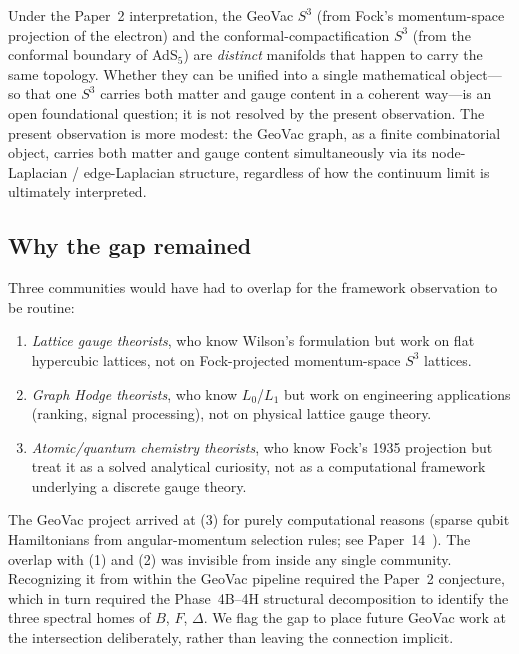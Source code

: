 \documentclass[aps,pra,twocolumn,superscriptaddress,longbibliography]{revtex4-2}
\begin{document}
Under the Paper~2 interpretation, the GeoVac $S^3$ (from Fock's
momentum-space projection of the electron) and the
conformal-compactification $S^3$ (from the conformal boundary of
AdS$_5$) are \emph{distinct} manifolds that happen to carry the same
topology.  Whether they can be unified into a single mathematical
object---so that one $S^3$ carries both matter and gauge content in
a coherent way---is an open foundational question; it is not
resolved by the present observation.  The present observation is
more modest: the GeoVac graph, as a finite combinatorial object,
carries both matter and gauge content simultaneously via its
node-Laplacian / edge-Laplacian structure, regardless of how the
continuum limit is ultimately interpreted.

\subsection{Why the gap remained}

Three communities would have had to overlap for the
framework observation to be routine:
\begin{enumerate}
\item \emph{Lattice gauge theorists}, who know Wilson's formulation
  but work on flat hypercubic lattices, not on Fock-projected
  momentum-space $S^3$ lattices.
\item \emph{Graph Hodge theorists}, who know $L_0$/$L_1$ but work
  on engineering applications (ranking, signal processing), not on
  physical lattice gauge theory.
\item \emph{Atomic/quantum chemistry theorists}, who know Fock's
  1935 projection but treat it as a solved analytical curiosity, not
  as a computational framework underlying a discrete gauge theory.
\end{enumerate}
The GeoVac project arrived at (3) for purely computational reasons
(sparse qubit Hamiltonians from angular-momentum selection rules;
see Paper~14~\cite{Paper14}).  The overlap with (1) and (2) was
invisible from inside any single community.  Recognizing it from
within the GeoVac pipeline required the Paper~2 conjecture, which in
turn required the Phase~4B--4H structural decomposition to
identify the three spectral homes of $B$, $F$, $\Delta$.  We flag
the gap to place future GeoVac work at the intersection
deliberately, rather than leaving the connection implicit.

\end{document}
